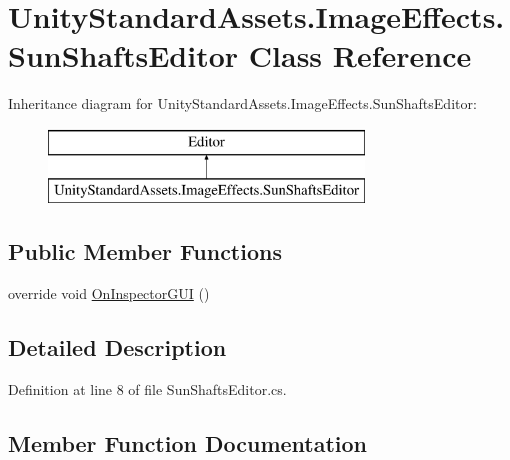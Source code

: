 \hypertarget{class_unity_standard_assets_1_1_image_effects_1_1_sun_shafts_editor}{}\section{Unity\+Standard\+Assets.\+Image\+Effects.\+Sun\+Shafts\+Editor Class Reference}
\label{class_unity_standard_assets_1_1_image_effects_1_1_sun_shafts_editor}
Inheritance diagram for Unity\+Standard\+Assets.\+Image\+Effects.\+Sun\+Shafts\+Editor\+:\begin{figure}[H]
\begin{center}
\leavevmode
\includegraphics[height=2.000000cm]{class_unity_standard_assets_1_1_image_effects_1_1_sun_shafts_editor}
\end{center}
\end{figure}
\subsection*{Public Member Functions}
\begin{DoxyCompactItemize}
\item 
override void \mbox{\hyperlink{class_unity_standard_assets_1_1_image_effects_1_1_sun_shafts_editor_ab4b45e1085bf271d0343b0607a507e98}{On\+Inspector\+G\+UI}} ()
\end{DoxyCompactItemize}


\subsection{Detailed Description}


Definition at line 8 of file Sun\+Shafts\+Editor.\+cs.



\subsection{Member Function Documentation}
\mbox{\label{class_unity_standard_assets_1_1_image_effects_1_1_sun_shafts_editor_ab4b45e1085bf271d0343b0607a507e98}} 
